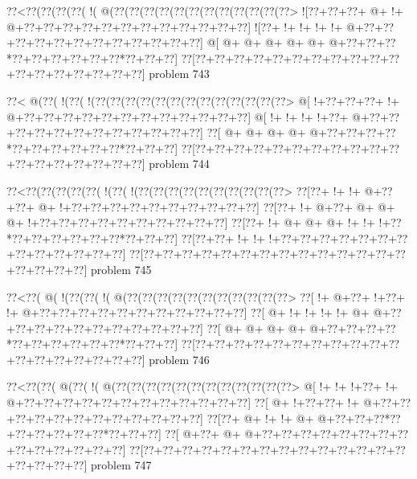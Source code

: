 \vbox{\vbox{\goo
\0??<\0??(\0??(\0??(\0??(\- !(\- @(\0??(\0??(\0??(\0??(\0??(\0??(\0??(\0??(\0??(\0??(\0??(\0??>
\- ![\0??+\0??+\0??+\- @+\- !+\- @+\0??+\0??+\0??+\0??+\0??+\0??+\0??+\0??+\0??+\0??+\0??+\0??]
\- ![\0??+\- !+\- !+\- !+\- !+\- @+\0??+\0??+\0??+\0??+\0??+\0??+\0??+\0??+\0??+\0??+\0??+\0??]
\- @[\- @+\- @+\- @+\- @+\- @+\- @+\0??+\0??+\0??*\0??+\0??+\0??+\0??+\0??+\0??*\0??+\0??+\0??]
\0??[\0??+\0??+\0??+\0??+\0??+\0??+\0??+\0??+\0??+\0??+\0??+\0??+\0??+\0??+\0??+\0??+\0??+\0??]
}
\hfil problem 743\hfil\break
}



\vbox{\vbox{\goo
\0??<\- @(\0??(\- !(\0??(\- !(\0??(\0??(\0??(\0??(\0??(\0??(\0??(\0??(\0??(\0??(\0??(\0??(\0??>
\- @[\- !+\0??+\0??+\0??+\- !+\- @+\0??+\0??+\0??+\0??+\0??+\0??+\0??+\0??+\0??+\0??+\0??+\0??]
\- @[\- !+\- !+\- !+\- !+\0??+\- @+\0??+\0??+\0??+\0??+\0??+\0??+\0??+\0??+\0??+\0??+\0??+\0??]
\0??[\- @+\- @+\- @+\- @+\- @+\0??+\0??+\0??+\0??*\0??+\0??+\0??+\0??+\0??+\0??*\0??+\0??+\0??]
\0??[\0??+\0??+\0??+\0??+\0??+\0??+\0??+\0??+\0??+\0??+\0??+\0??+\0??+\0??+\0??+\0??+\0??+\0??]
}
\hfil problem 744\hfil\break
}



\vbox{\vbox{\goo
\0??<\0??(\0??(\0??(\0??(\0??(\- !(\0??(\- !(\0??(\0??(\0??(\0??(\0??(\0??(\0??(\0??(\0??(\0??>
\0??[\0??+\- !+\- !+\- @+\0??+\0??+\- @+\- !+\0??+\0??+\0??+\0??+\0??+\0??+\0??+\0??+\0??+\0??]
\0??[\0??+\- !+\- @+\0??+\- @+\- @+\- @+\- !+\0??+\0??+\0??+\0??+\0??+\0??+\0??+\0??+\0??+\0??]
\0??[\0??+\- !+\- @+\- @+\- @+\- !+\- !+\- !+\0??*\0??+\0??+\0??+\0??+\0??+\0??*\0??+\0??+\0??]
\0??[\0??+\0??+\- !+\- !+\- !+\0??+\0??+\0??+\0??+\0??+\0??+\0??+\0??+\0??+\0??+\0??+\0??+\0??]
\0??[\0??+\0??+\0??+\0??+\0??+\0??+\0??+\0??+\0??+\0??+\0??+\0??+\0??+\0??+\0??+\0??+\0??+\0??]
}
\hfil problem 745\hfil\break
}



\vbox{\vbox{\goo
\0??<\0??(\- @(\- !(\0??(\0??(\- !(\- @(\0??(\0??(\0??(\0??(\0??(\0??(\0??(\0??(\0??(\0??(\0??>
\0??[\- !+\- @+\0??+\- !+\0??+\- !+\- @+\0??+\0??+\0??+\0??+\0??+\0??+\0??+\0??+\0??+\0??+\0??]
\0??[\- @+\- !+\- !+\- !+\- !+\- @+\- @+\0??+\0??+\0??+\0??+\0??+\0??+\0??+\0??+\0??+\0??+\0??]
\0??[\- @+\- @+\- @+\- @+\- @+\0??+\0??+\0??+\0??*\0??+\0??+\0??+\0??+\0??+\0??*\0??+\0??+\0??]
\0??[\0??+\0??+\0??+\0??+\0??+\0??+\0??+\0??+\0??+\0??+\0??+\0??+\0??+\0??+\0??+\0??+\0??+\0??]
}
\hfil problem 746\hfil\break
}



\vbox{\vbox{\goo
\0??<\0??(\0??(\- @(\0??(\- !(\- @(\0??(\0??(\0??(\0??(\0??(\0??(\0??(\0??(\0??(\0??(\0??(\0??>
\- @[\- !+\- !+\- !+\0??+\- !+\- @+\0??+\0??+\0??+\0??+\0??+\0??+\0??+\0??+\0??+\0??+\0??+\0??]
\0??[\- @+\- !+\0??+\0??+\- !+\- @+\0??+\0??+\0??+\0??+\0??+\0??+\0??+\0??+\0??+\0??+\0??+\0??]
\0??[\0??+\- @+\- !+\- !+\- @+\- @+\0??+\0??+\0??*\0??+\0??+\0??+\0??+\0??+\0??*\0??+\0??+\0??]
\0??[\- @+\0??+\- @+\- @+\0??+\0??+\0??+\0??+\0??+\0??+\0??+\0??+\0??+\0??+\0??+\0??+\0??+\0??]
\0??[\0??+\0??+\0??+\0??+\0??+\0??+\0??+\0??+\0??+\0??+\0??+\0??+\0??+\0??+\0??+\0??+\0??+\0??]
}
\hfil problem 747\hfil\break
}



